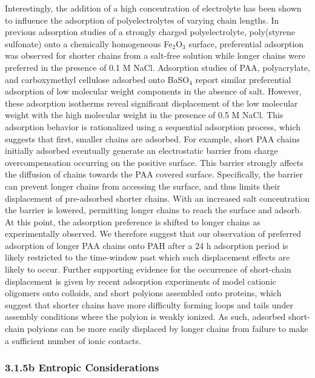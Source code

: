 \documentclass[journal=mamobx,manuscript=article]{achemso}
\begin{document}
Interestingly, the addition of a high concentration of electrolyte has been shown to influence the adsorption of polyelectrolytes of varying chain lengths.  In previous adsorption studies of a strongly charged polyelectrolyte, poly(styrene sulfonate) onto a chemically homogeneous Fe$_2$O$_3$ surface, preferential adsorption was observed for shorter chains from a salt-free solution while longer chains were preferred in the presence of 0.1 M NaCl.\cite{Ramachandran1987,Ramachandran1988}  Adsorption studies of PAA,\cite{Wright1987} polyacrylate,\cite{Bain1982} and carboxymethyl cellulose\cite{Bain1982} adsorbed onto BaSO$_4$ report similar preferential adsorption of low molecular weight components in the absence of salt.  However, these adsorption isotherms reveal significant displacement of the low molecular weight with the high molecular weight in the presence of 0.5 M NaCl.\cite{Bain1982} This adsorption behavior is rationalized using a sequential adsorption process, which suggests that first, smaller chains are adsorbed.\cite{DeLaat1995}  For example, short PAA chains initially adsorbed eventually generate an electrostatic barrier from charge overcompensation occurring on the positive surface.  This barrier strongly affects the diffusion of chains towards the PAA covered surface.  Specifically, the barrier can prevent longer chains from accessing the surface, and thus limits their displacement of pre-adsorbed shorter chains.  With an increased salt concentration the barrier is lowered, permitting longer chains to reach the surface and adsorb.  At this point, the adsorption preference is shifted to longer chains as experimentally observed.\cite{DeLaat1995}  We therefore suggest that our observation of preferred adsorption of longer PAA chains onto PAH after a 24 h adsorption period is likely restricted to the time-window past which such displacement effects are likely to occur.  Further supporting evidence for the occurrence of short-chain displacement is given by recent adsorption experiments of model cationic oligomers onto colloids,\cite{Shin2001} and short polyions assembled onto proteins,\cite{Houska2004} which suggest that shorter chains have more difficulty forming loops and tails under assembly conditions where the polyion is weakly ionized.  As such, adsorbed short-chain polyions can be more easily displaced by longer chains from failure to make a sufficient number of ionic contacts.  

\subsubsection{3.1.5b Entropic Considerations}  %
    \label{sec-entropic}
\end{document}

